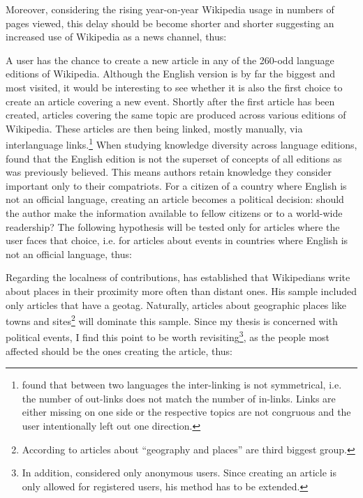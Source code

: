 
Moreover, considering the rising year-on-year Wikipedia usage in numbers of pages viewed\cite{wikipv}, this delay should be become shorter and shorter suggesting an increased use of Wikipedia as a news channel, thus:


A user has the chance to create a new article in any of the 260-odd language editions of Wikipedia.
Although the English version is by far the biggest and most visited, it would be interesting to see whether it is also the first choice to create an article covering a new event.
Shortly after the first article has been created, articles covering the same topic are produced across various editions of Wikipedia.
These articles are then being linked, mostly manually, via interlanguage links.\footnote{\textcite{adar2009information} found that between two languages the inter-linking is not symmetrical, i.e. the number of out-links does not match the number of in-links. Links are either missing on one side or the respective topics are not congruous and the user intentionally left out one direction.}
When studying knowledge diversity across language editions, \textcite{hecht2010tower} found that the English edition is not the superset of concepts of all editions as was previously believed.
This means authors retain knowledge they consider important only to their compatriots.
For a citizen of a country where English is not an official language, creating an article becomes a political decision: should the author make the information available to fellow citizens or to a world-wide readership?
The following hypothesis will be tested only for articles where the user faces that choice, i.e. for articles about events in countries where English is not an official language, thus:


Regarding the localness of contributions, \textcite[57]{hardy2011volunteered} has established that Wikipedians write about places in their proximity more often than distant ones.
His sample included only articles that have a geotag.
Naturally, articles about geographic places like towns and sites\footnote{According to \textcite{kittur2009s} articles about ``geography and places'' are third biggest group.} will dominate this sample.
Since my thesis is concerned with political events, I find this point to be worth revisiting\footnote{In addition, \textcite[61]{hardy2011volunteered} considered only anonymous users. Since creating an article is only allowed for registered users, his method has to be extended.}, as the people most affected should be the ones creating the article, thus:

